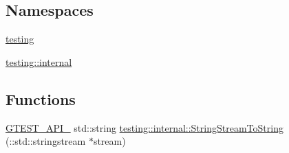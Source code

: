 \subsection*{Namespaces}
\begin{DoxyCompactItemize}
\item 
 \hyperlink{namespacetesting}{testing}
\item 
 \hyperlink{namespacetesting_1_1internal}{testing\+::internal}
\end{DoxyCompactItemize}
\subsection*{Functions}
\begin{DoxyCompactItemize}
\item 
\hyperlink{gtest-port_8h_aa73be6f0ba4a7456180a94904ce17790}{G\+T\+E\+S\+T\+\_\+\+A\+P\+I\+\_\+} std\+::string \hyperlink{namespacetesting_1_1internal_ac0a2b7f69fc829d80a39e925b6417e39}{testing\+::internal\+::\+String\+Stream\+To\+String} (\+::std\+::stringstream $\ast$stream)
\end{DoxyCompactItemize}
